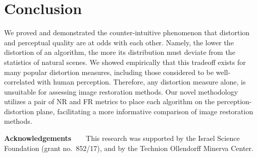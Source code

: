 \section{Conclusion}
We proved and demonstrated the counter-intuitive phenomenon that distortion and perceptual quality are at odds with each other. Namely, the lower the distortion of an algorithm, the more its distribution must deviate from the statistics of natural scenes. We showed empirically that this tradeoff exists for many popular distortion measures, including those considered to be well-correlated with human perception. Therefore, any distortion measure alone, is unsuitable for assessing image restoration methods. Our novel methodology utilizes a pair of NR and FR metrics to place each algorithm on the perception-distortion plane, facilitating a more informative comparison of image restoration methods.

\vspace{0.2cm}
\noindent \textbf{Acknowledgements\ \ \ }
%
This research was supported by the Israel Science Foundation (grant no.~852/17), and by the Technion Ollendorff Minerva Center.
